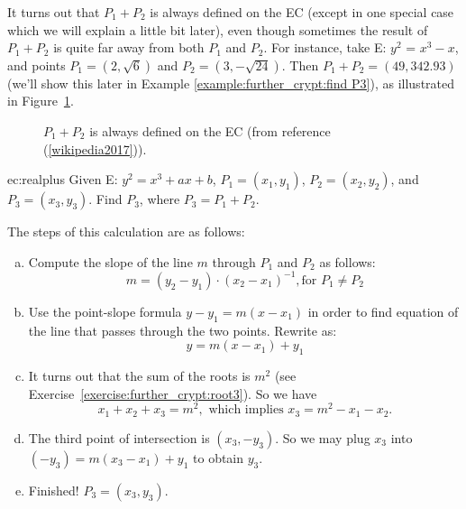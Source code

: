 It turns out that $P_1 + P_2$ is always defined on the EC (except in one special case which we will explain a little bit later), even though sometimes the result of $P_1 + P_2$ is quite far away from both $P_1$ and $P_2$.  For instance, take E: $ y^2$ = $x^3 - x$, and points $P_1 = (2, \sqrt{6})$ and $P_2 = (3, -\sqrt{24})$.  Then $P_1 + P_2 = (49,342.93)$ (we'll show this later in Example \ref{example:further_crypt:find P3}), as illustrated in Figure~\ref{fig:DH:DHKE_16}. 
\begin{figure}[htbp]
	  \caption{\label{fig:DH:DHKE_16} $P_1 + P_2$ is always defined on the EC (from reference (\ref{wikipedia2017})).}
\end{figure}

\begin{example}{ec:realplus}
Given E: $y^2 = x^3 + ax + b$, $P_1 = (x_1, y_1)$, $P_2 = (x_2, y_2)$, and $P_3 = (x_3, y_3)$. Find $P_3$, where $ P_3 =  P_1 + P_2$.

\noindent
The steps of this calculation are as follows:
\begin{enumerate}[(a)]
\item
Compute the slope of the line $m$ through $P_1$ and $P_2$ as follows:  \[ m =(y_2 - y_1) \cdot (x_2- x_1)^{-1}, \text{for } P_1 \neq P_2  \] 
\item
Use the point-slope formula $y - y_1 = m(x-x_1)$  in order to find equation of the line that passes through the two points.  Rewrite as: \[y  = m(x-x_1) + y_1\]
\item
It turns out that the sum of the roots is $m^2$ (see Exercise~\ref{exercise:further_crypt:root3}). So we have
\[x_1 + x_2 + x_3 = m^2, \text{ which implies } x_3 =   m^2 -  x_1 - x_2.\]
\item  The third point of intersection is $(x_3, -y_3)$. So  we may plug $x_3$ into $(-y_3)  = m(x_3-x_1) + y_1$ to obtain $y_3$. 
\item Finished!  $P_3 = (x_3,y_3)$.
\end{enumerate}
 \end{example} 

